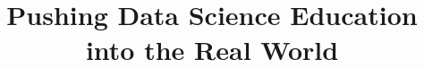\documentclass{sig-alternate}
\begin{document}
%



\title{Pushing Data Science Education into the Real World}

%
%
%
%
%
\end{document}
